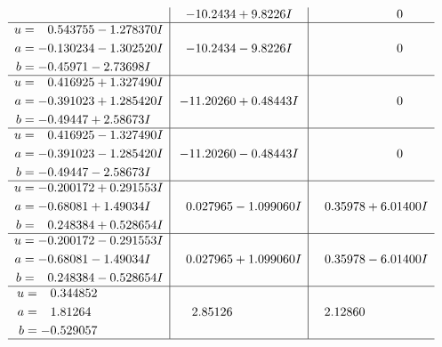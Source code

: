 \documentclass[1p]{elsarticle_modified}
\theoremstyle{definition}
\begin{document}
$$\begin{array}{c|c|c}
 & -10.2434 + 9.8226 I & \phantom{-0.000000 } 0 \\ \hline\begin{aligned}
u &= \phantom{-}0.543755 - 1.278370 I \\
a &= -0.130234 - 1.302520 I \\
b &= -0.45971 - 2.73698 I\end{aligned}
 & -10.2434 - 9.8226 I & \phantom{-0.000000 } 0 \\ \hline\begin{aligned}
u &= \phantom{-}0.416925 + 1.327490 I \\
a &= -0.391023 + 1.285420 I \\
b &= -0.49447 + 2.58673 I\end{aligned}
 & -11.20260 + 0.48443 I & \phantom{-0.000000 } 0 \\ \hline\begin{aligned}
u &= \phantom{-}0.416925 - 1.327490 I \\
a &= -0.391023 - 1.285420 I \\
b &= -0.49447 - 2.58673 I\end{aligned}
 & -11.20260 - 0.48443 I & \phantom{-0.000000 } 0 \\ \hline\begin{aligned}
u &= -0.200172 + 0.291553 I \\
a &= -0.68081 + 1.49034 I \\
b &= \phantom{-}0.248384 + 0.528654 I\end{aligned}
 & \phantom{-}0.027965 - 1.099060 I & \phantom{-}0.35978 + 6.01400 I \\ \hline\begin{aligned}
u &= -0.200172 - 0.291553 I \\
a &= -0.68081 - 1.49034 I \\
b &= \phantom{-}0.248384 - 0.528654 I\end{aligned}
 & \phantom{-}0.027965 + 1.099060 I & \phantom{-}0.35978 - 6.01400 I \\ \hline\begin{aligned}
u &= \phantom{-}0.344852\phantom{ +0.000000I} \\
a &= \phantom{-}1.81264\phantom{ +0.000000I} \\
b &= -0.529057\phantom{ +0.000000I}\end{aligned}
 & \phantom{-}2.85126\phantom{ +0.000000I} & \phantom{-}2.12860\phantom{ +0.000000I}\\
 \hline 
 \end{array}$$\newpage\newpage\renewcommand{\arraystretch}{1}
\end{document}

